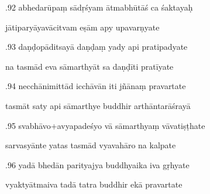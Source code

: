 \documentclass[article,12pt,a4paper]{memoir}%
\newcounter{parCount}
\begin{document}
	  
	  \pstart {}.92 abhedarūpaṃ sādṛśyam ātmabhūtāś ca śaktayaḥ 
	{}
	\pend%
      

	  
	  \pstart \leavevmode%
	jātiparyāyavācitvam eṣām apy upavarṇyate 
	{}
	\pend%
      

	  
	  \pstart {}.93 daṇḍopāditsayā daṇḍaṃ yady api pratipadyate 
	{}
	\pend%
      

	  
	  \pstart \leavevmode%
	na tasmād eva sāmarthyāt sa daṇḍīti pratīyate 
	{}
	\pend%
      

	  
	  \pstart {}.94 necchānimittād icchāvān iti jñānaṃ pravartate 
	{}
	\pend%
      

	  
	  \pstart \leavevmode%
	tasmāt saty api sāmarthye buddhir arthāntarāśrayā 
	{}
	\pend%
      

	  
	  \pstart {}.95 svabhāvo+avyapadeśyo vā sāmarthyaṃ vāvatiṣṭhate 
	{}
	\pend%
      

	  
	  \pstart \leavevmode%
	sarvasyānte yatas tasmād vyavahāro na kalpate 
	{}
	\pend%
      

	  
	  \pstart {}.96 yadā bhedān parityajya buddhyaika iva gṛhyate 
	{}
	\pend%
      

	  
	  \pstart \leavevmode%
	vyaktyātmaiva tadā tatra buddhir ekā pravartate 
	{}
	\pend%
      
\end{document}
